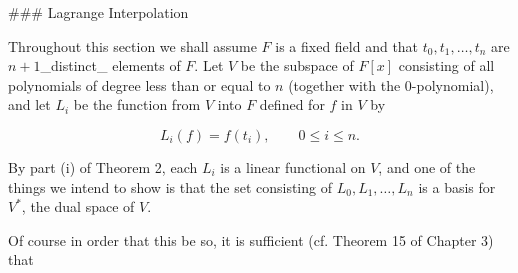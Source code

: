 

### Lagrange Interpolation

Throughout this section we shall assume \(F\) is a fixed field and that \(t_{0},t_{1},\ldots,t_{n}\) are \(n+1\)_distinct_ elements of \(F\). Let \(V\) be the subspace of \(F[x]\) consisting of all polynomials of degree less than or equal to \(n\) (together with the \(0\)-polynomial), and let \(L_{i}\) be the function from \(V\) into \(F\) defined for \(f\) in \(V\) by

\[L_{i}(f)=f(t_{i}),\qquad 0\leq i\leq n.\]

By part (i) of Theorem 2, each \(L_{i}\) is a linear functional on \(V\), and one of the things we intend to show is that the set consisting of \(L_{0},L_{1},\ldots,L_{n}\) is a basis for \(V^{*}\), the dual space of \(V\).

Of course in order that this be so, it is sufficient (cf. Theorem 15 of Chapter 3) that \